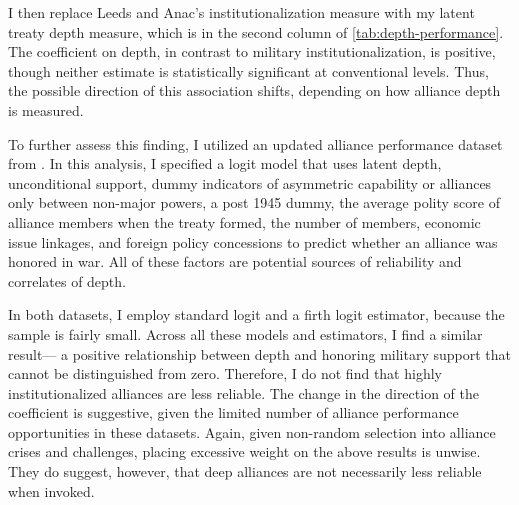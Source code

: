 \documentclass[12pt]{article}
\begin{document}
I then replace Leeds and Anac's institutionalization measure with my latent treaty depth measure, which is in the second column of \autoref{tab:depth-performance}. 
The coefficient on depth, in contrast to military institutionalization, is positive, though neither estimate is statistically significant at conventional levels. 
Thus, the possible direction of this association shifts, depending on how alliance depth is measured.


To further assess this finding, I utilized an updated alliance performance dataset from \citet{BerkemeierFuhrmann2018}.
In this analysis, I specified a logit model that uses latent depth, unconditional support, dummy indicators of asymmetric capability or alliances only between non-major powers, a post 1945 dummy, the average polity score of alliance members when the treaty formed, the number of members, economic issue linkages, and foreign policy concessions to predict whether an alliance was honored in war. 
All of these factors are potential sources of reliability and correlates of depth. 


In both datasets, I employ standard logit and a firth logit estimator, because the sample is fairly small. 
Across all these models and estimators, I find a similar result--- a positive relationship between depth and honoring military support that cannot be distinguished from zero.
Therefore, I do not find that highly institutionalized alliances are less reliable. 
The change in the direction of the coefficient is suggestive, given the limited number of alliance performance opportunities in these datasets. 
Again, given non-random selection into alliance crises and challenges, placing excessive weight on the above results is unwise. 
They do suggest, however, that deep alliances are not necessarily less reliable when invoked. 





  
 
\end{document}
